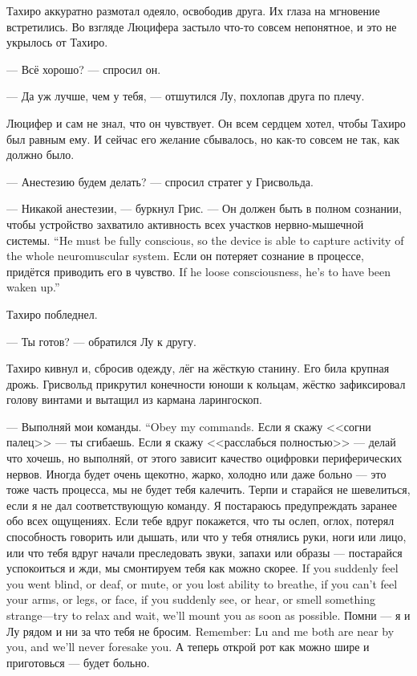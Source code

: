 Тахиро аккуратно размотал одеяло, освободив друга.
Их глаза на мгновение встретились.
Во взгляде Люцифера застыло что-то совсем непонятное, и это не укрылось от Тахиро.

--- Всё хорошо? --- спросил он.

--- Да уж лучше, чем у тебя, --- отшутился Лу, похлопав друга по плечу.

Люцифер и сам не знал, что он чувствует.
Он всем сердцем хотел, чтобы Тахиро был равным ему.
И сейчас его желание сбывалось, но как-то совсем не так, как должно было.

--- Анестезию будем делать? --- спросил стратег у Грисвольда.

--- Никакой анестезии, --- буркнул Грис.
{--- Он должен быть в полном сознании, чтобы устройство захватило активность всех участков нервно-мышечной системы.}
{``He must be fully conscious, so the device is able to capture activity of the whole neuromuscular system.}
{Если он потеряет сознание в процессе, придётся приводить его в чувство.}
{If he loose consciousness, he's to have been waken up.''}

Тахиро побледнел.

--- Ты готов? --- обратился Лу к другу.

Тахиро кивнул и, сбросив одежду, лёг на жёсткую станину.
Его била крупная дрожь.
Грисвольд прикрутил конечности юноши к кольцам, жёстко зафиксировал голову винтами и вытащил из кармана ларингоскоп.

{--- Выполняй мои команды.}
{``Obey my commands.}
Если я скажу <<согни палец>> --- ты сгибаешь.
Если я скажу <<расслабься полностью>> --- делай что хочешь, но выполняй, от этого зависит качество оцифровки периферических нервов.
Иногда будет очень щекотно, жарко, холодно или даже больно --- это тоже часть процесса, мы не будет тебя калечить.
Терпи и старайся не шевелиться, если я не дал соответствующую команду.
Я постараюсь предупреждать заранее обо всех ощущениях.
{Если тебе вдруг покажется, что ты ослеп, оглох, потерял способность говорить или дышать, или что у тебя отнялись руки, ноги или лицо, или что тебя вдруг начали преследовать звуки, запахи или образы --- постарайся успокоиться и жди, мы смонтируем тебя как можно скорее.}
{If you suddenly feel you went blind, or deaf, or mute, or you lost ability to breathe, if you can't feel your arms, or legs, or face, if you suddenly see, or hear, or smell something strange---try to relax and wait, we'll mount you as soon as possible.}
{Помни --- я и Лу рядом и ни за что тебя не бросим.}
{Remember: Lu and me both are near by you, and we'll never foresake you.}
А теперь открой рот как можно шире и приготовься --- будет больно.

